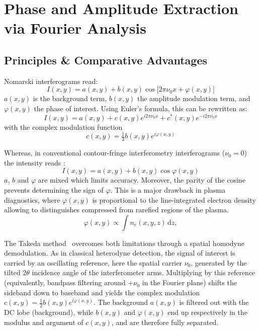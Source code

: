 \documentclass[11pt,a4paper]{article}
\begin{document}
\section{Phase and Amplitude Extraction via Fourier Analysis}

\subsection{Principles \& Comparative Advantages}

Nomarski interferograms read:
\begin{equation}
    I(x,y) = a(x,y) + b(x,y)\cos\!\big[2\pi\nu_0 x + \varphi(x,y)\big]
\end{equation}
$a(x,y)$ is the background term, $b(x,y)$ the amplitude modulation term, and $\varphi(x,y)$ the phase of interest. Using Euler's formula, this can be rewritten as:
\begin{equation}
I(x,y) = a(x,y) + c(x,y)e^{i2\pi\nu_0 x} + c^*(x,y)e^{-i2\pi\nu_0 x}
\end{equation}
with the complex modulation function
\begin{equation}
    c(x, y) = \tfrac{1}{2}b(x, y)e^{i\varphi(x, y)}
\end{equation}

Whereas, in conventional contour-fringe interferometry interferograms ($\nu_0 = 0$) the intensity reads : $$I(x,y) = a(x,y) + b(x,y)\cos\varphi(x,y)$$
$a$, $b$ and $\varphi$ are mixed which limits accuracy. Moreover, the parity of the cosine prevents determining the sign of $\varphi$. This is a major drawback in plasma diagnostics, where $\varphi(x,y)$ is proportional to the line-integrated electron density allowing to distinguishes compressed from rarefied regions of the plasma.
\begin{equation}
\varphi(x,y) \propto \int n_e(x,y,z)\,\mathrm{d}z,
\end{equation}

The Takeda method~\cite{takeda1982fourier} overcomes both limitations through a spatial homodyne demodulation. As in classical heterodyne detection, the signal of interest is carried by an oscillating reference, here the spatial carrier $\nu_0$, generated by the tilted $2\theta$ incidence angle of the interferometer arms. Multiplying by this reference (equivalently, bandpass filtering around $+\nu_0$ in the Fourier plane) shifts the sideband down to baseband and yields the complex modulation $c(x,y) = \tfrac{1}{2}b(x,y)e^{i\varphi(x,y)}$. The background $a(x,y)$ is filtered out with the DC lobe (background), while $b(x,y)$ and $\varphi(x,y)$ end up respectively in the modulus and argument of $c(x,y)$, and are therefore fully separated.
\end{document}
